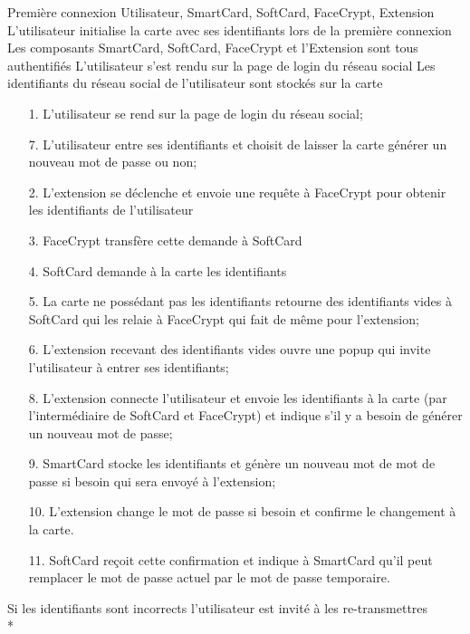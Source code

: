 \documentclass[a4paper,11pt,french]{article}
\begin{document}
\fiche
{Première connexion}
	{Utilisateur, SmartCard, SoftCard, FaceCrypt, Extension}
    {L'utilisateur initialise la carte avec ses identifiants lors de 
        la première connexion}
    {Les composants SmartCard, SoftCard, FaceCrypt et l'Extension sont 
        tous authentifiés}
    {L'utilisateur s'est rendu sur la page de login du réseau social}
    {Les identifiants du réseau social de l'utilisateur sont stockés
    sur la carte} 
    {\begin{itemize}
        \item[]
        \item[1.] L'utilisateur se rend sur la page de login du réseau 
        social;
        \item[7.] L'utilisateur entre ses identifiants et choisit de laisser
            la carte générer un nouveau mot de passe ou non;
    \end{itemize}}
	{\begin{itemize}
        \item[]
        \item[2.] L'extension se déclenche et envoie une requête à 
        FaceCrypt pour obtenir les identifiants de l'utilisateur
        \item[3.] FaceCrypt transfère cette demande à SoftCard
        \item[4.] SoftCard demande à la carte les identifiants
        \item[5.] La carte ne possédant pas les identifiants retourne 
        des identifiants vides à SoftCard qui les relaie à FaceCrypt qui fait
        de même pour l'extension;
        \item[6.] L'extension recevant des identifiants vides ouvre une popup
        qui invite l'utilisateur à entrer ses identifiants;
        \item[8.] L'extension connecte l'utilisateur et envoie les identifiants
        à la carte (par l'intermédiaire de SoftCard et FaceCrypt) et indique
        s'il y a besoin de générer un nouveau mot de passe;
        \item[9.] SmartCard stocke les identifiants et génère un nouveau mot de
        mot de passe si besoin qui sera envoyé à l'extension;
        \item[10.] L'extension change le mot de passe si besoin et confirme
            le changement à la carte.
        \item[11.] SoftCard reçoit cette confirmation et indique à SmartCard 
            qu'il peut remplacer le mot de passe actuel par le mot de passe 
            temporaire.
	\end{itemize}
	}
	{}
\flots
    {Si les identifiants sont incorrects l'utilisateur est invité à les 
    re-transmettres}
    {}
\\*
\end{document}
